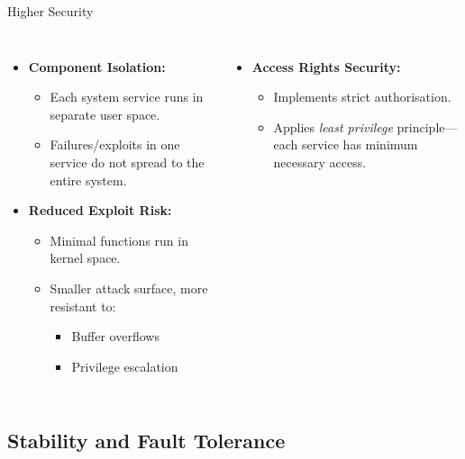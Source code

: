 \documentclass[aspectratio=169, table]{beamer}
\begin{document}
\begin{frame}{Higher Security}
\begin{columns}
\begin{itemize}
	\item \textbf{Component Isolation:}
	\begin{itemize}
		\item Each system service runs in separate user space.
		\item Failures/exploits in one service do not spread to the entire system.
	\end{itemize}
	
	\item \textbf{Reduced Exploit Risk:}
	\begin{itemize}
		\item Minimal functions run in kernel space.
		\item Smaller attack surface, more resistant to:
		\begin{itemize}
			\item Buffer overflows
			\item Privilege escalation
		\end{itemize}
	\end{itemize}
\end{itemize}
\begin{itemize}
	\item \textbf{Access Rights Security:}
	\begin{itemize}
		\item Implements strict authorisation.
		\item Applies \textit{least privilege} principle—each service has minimum necessary access.
	\end{itemize}
\end{itemize}
\end{columns}
\end{frame}

\subsection{Stability and Fault Tolerance}
\end{document}
